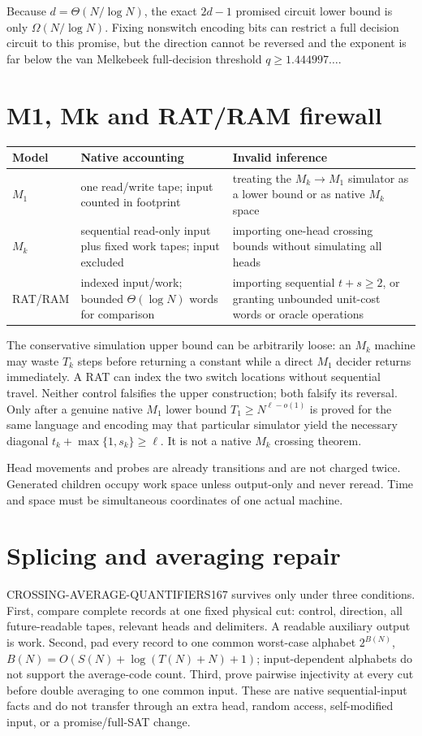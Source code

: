 \documentclass[11pt]{article}
\begin{document}
Because \(d=\Theta(N/\log N)\), the exact \(2d-1\) promised circuit lower bound is only \(\Omega(N/\log N)\). Fixing nonswitch encoding bits can restrict a full decision circuit to this promise, but the direction cannot be reversed and the exponent is far below the van Melkebeek full-decision threshold \(q\ge1.444997\ldots\).

\section{M1, Mk and RAT/RAM firewall}
\begin{center}\small
\begin{tabularx}{.99\linewidth}{p{.15\linewidth}p{.25\linewidth}X}\toprule
Model & Native accounting & Invalid inference\\\midrule
\(M_1\) & one read/write tape; input counted in footprint & treating the \(M_k\to M_1\) simulator as a lower bound or as native \(M_k\) space\\
\(M_k\) & sequential read-only input plus fixed work tapes; input excluded & importing one-head crossing bounds without simulating all heads\\
RAT/RAM & indexed input/work; bounded \(\Theta(\log N)\) words for comparison & importing sequential \(t+s\ge2\), or granting unbounded unit-cost words or oracle operations\\\bottomrule
\end{tabularx}
\end{center}
The conservative simulation upper bound can be arbitrarily loose: an \(M_k\) machine may waste \(T_k\) steps before returning a constant while a direct \(M_1\) decider returns immediately. A RAT can index the two switch locations without sequential travel. Neither control falsifies the upper construction; both falsify its reversal. Only after a genuine native \(M_1\) lower bound \(T_1\ge N^{\ell-o(1)}\) is proved for the same language and encoding may that particular simulator yield the necessary diagonal \(t_k+\max\{1,s_k\}\ge\ell\). It is not a native \(M_k\) crossing theorem.

Head movements and probes are already transitions and are not charged twice. Generated children occupy work space unless output-only and never reread. Time and space must be simultaneous coordinates of one actual machine.

\section{Splicing and averaging repair}
CROSSING-AVERAGE-QUANTIFIERS167 survives only under three conditions. First, compare complete records at one fixed physical cut: control, direction, all future-readable tapes, relevant heads and delimiters. A readable auxiliary output is work. Second, pad every record to one common worst-case alphabet \(2^{B(N)}\), \(B(N)=O(S(N)+\log(T(N)+N)+1)\); input-dependent alphabets do not support the average-code count. Third, prove pairwise injectivity at every cut before double averaging to one common input. These are native sequential-input facts and do not transfer through an extra head, random access, self-modified input, or a promise/full-SAT change.
\end{document}
